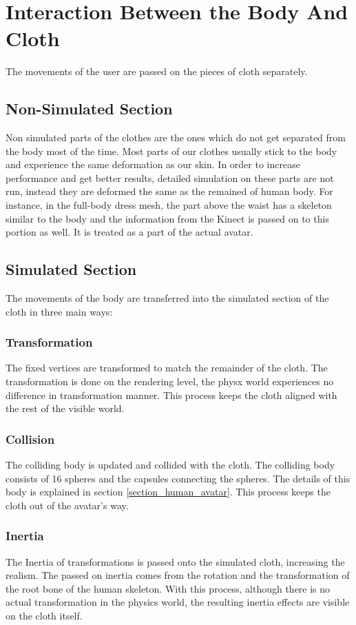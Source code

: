 \section{Interaction Between the Body And Cloth}
\label{section_body_cloth_interaction}
The movements of the user are passed on the pieces of cloth separately.

\subsection{Non-Simulated Section}
Non simulated parts of the clothes are the ones which do not get separated from
the body most of the time. Most parts of our clothes usually stick to the body and experience the same deformation as our skin. In order to 
increase performance and get better results, detailed simulation on these parts are not run, instead they are deformed the same as the remained of human body.
For instance, in the full-body dress mesh, the part above the waist has a skeleton similar to the body and the information from the Kinect is passed on to this portion as well.
 It is treated as a part of the actual avatar.

\subsection{Simulated Section}
The movements of the body are transferred into the simulated section of the cloth in three main ways:

\subsubsection{Transformation}
The fixed vertices are transformed to match the remainder of the cloth. The
transformation is done on the rendering level, the physx world experiences no difference in transformation manner. 
This process keeps the cloth aligned with the rest of the visible world.

\subsubsection{Collision}
The colliding body is updated and collided with the cloth. The colliding body
consists of 16 spheres and the capsules connecting the spheres. The details of
this body is explained in section \ref{section_human_avatar}. This process keeps the
cloth out of the avatar’s way.

\subsubsection{Inertia}
The Inertia of transformations is passed onto the simulated cloth, increasing
the realism. The passed on inertia comes from the rotation and the transformation of the root bone of the human skeleton.
 With this process, although there is no actual transformation in the physics world, the resulting inertia effects are visible on the cloth itself. 

